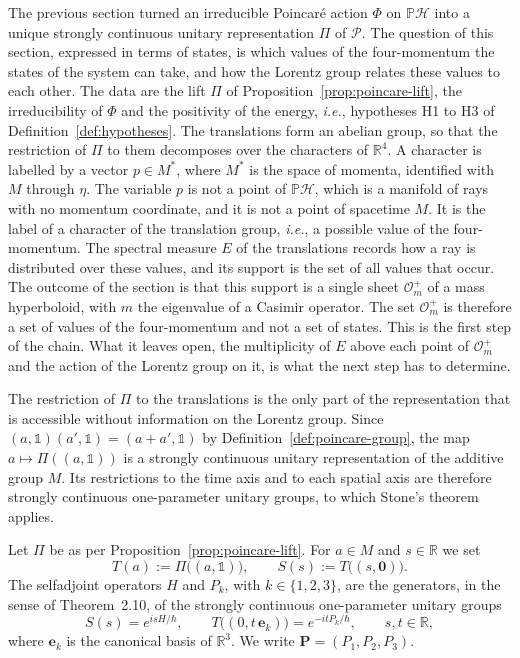 The previous section turned an irreducible Poincar\'e action $\Phi$ on $\mathbb{P}\mathcal{H}$ into a unique strongly continuous unitary representation $\Pi$ of $\mathcal{P}$. The question of this section, expressed in terms of states, is which values of the four-momentum the states of the system can take, and how the Lorentz group relates these values to each other. The data are the lift $\Pi$ of Proposition~\ref{prop:poincare-lift}, the irreducibility of $\Phi$ and the positivity of the energy, \textit{i.e.}, hypotheses H1 to H3 of Definition~\ref{def:hypotheses}. The translations form an abelian group, so that the restriction of $\Pi$ to them decomposes over the characters of $\mathbb{R}^4$. A character is labelled by a vector $p\in M^*$, where $M^*$ is the space of momenta, identified with $M$ through $\eta$. The variable $p$ is not a point of $\mathbb{P}\mathcal{H}$, which is a manifold of rays with no momentum coordinate, and it is not a point of spacetime $M$. It is the label of a character of the translation group, \textit{i.e.}, a possible value of the four-momentum. The spectral measure $E$ of the translations records how a ray is distributed over these values, and its support is the set of all values that occur. The outcome of the section is that this support is a single sheet $\mathcal{O}_m^+$ of a mass hyperboloid, with $m$ the eigenvalue of a Casimir operator. The set $\mathcal{O}_m^+$ is therefore a set of values of the four-momentum and not a set of states. This is the first step of the chain. What it leaves open, the multiplicity of $E$ above each point of $\mathcal{O}_m^+$ and the action of the Lorentz group on it, is what the next step has to determine.

The restriction of $\Pi$ to the translations is the only part of the representation that is accessible without information on the Lorentz group. Since $(a,\mathbb{1})(a',\mathbb{1})=(a+a',\mathbb{1})$ by Definition~\ref{def:poincare-group}, the map $a\mapsto\Pi((a,\mathbb{1}))$ is a strongly continuous unitary representation of the additive group $M$. Its restrictions to the time axis and to each spatial axis are therefore strongly continuous one-parameter unitary groups, to which Stone's theorem applies.

\begin{definition}\label{def:poincare-generators}
	Let $\Pi$ be as per Proposition~\ref{prop:poincare-lift}. For $a\in M$ and $s\in\mathbb{R}$ we set
	\begin{equation*}
		T(a):=\Pi\big((a,\mathbb{1})\big), \qquad S(s):=T\big((s,\mathbf{0})\big).
	\end{equation*}
	The selfadjoint operators $H$ and $P_k$, with $k\in\{1,2,3\}$, are the generators, in the sense of Theorem~2.10, of the strongly continuous one-parameter unitary groups
	\begin{equation}\label{eq:generators-convention}
		S(s)=e^{isH/\hbar}, \qquad T\big((0,t\,\mathbf{e}_k)\big)=e^{-itP_k/\hbar}, \qquad s,t\in\mathbb{R},
	\end{equation}
	where $\mathbf{e}_k$ is the canonical basis of $\mathbb{R}^3$. We write $\mathbf{P}=(P_1,P_2,P_3)$.
\end{definition}

